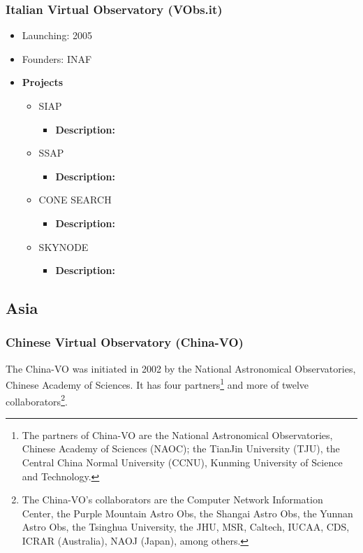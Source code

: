 \subsubsection{Italian Virtual Observatory (VObs.it)}
\begin{itemize}
	\item Launching: 2005
	\item Founders: INAF
	\item \textbf{Projects}
	\begin{itemize}
		\item SIAP
			\begin{itemize}
				\item \textbf{Description:}
			\end{itemize}
		\item SSAP
			\begin{itemize}
				\item \textbf{Description:}
			\end{itemize}
		\item CONE SEARCH
			\begin{itemize}
				\item \textbf{Description:}
			\end{itemize}
		\item SKYNODE
			\begin{itemize}
				\item \textbf{Description:}
			\end{itemize}
	\end{itemize}
\end{itemize}

\subsection{Asia}
\subsubsection{Chinese Virtual Observatory (China-VO)}
The China-VO was initiated in 2002 by the National Astronomical Observatories,
Chinese Academy of Sciences. It has four partners\footnote{The partners of
China-VO are the National Astronomical Observatories, Chinese Academy of
Sciences (NAOC); the TianJin University (TJU), the Central China Normal
University (CCNU), Kunming University of Science and Technology.} and more of
twelve collaborators\footnote{The China-VO's collaborators are the Computer
Network Information Center, the Purple Mountain Astro Obs, the Shangai Astro
Obs, the Yunnan Astro Obs, the Tsinghua University, the JHU, MSR, Caltech,
IUCAA, CDS, ICRAR (Australia), NAOJ (Japan), among others.}.

